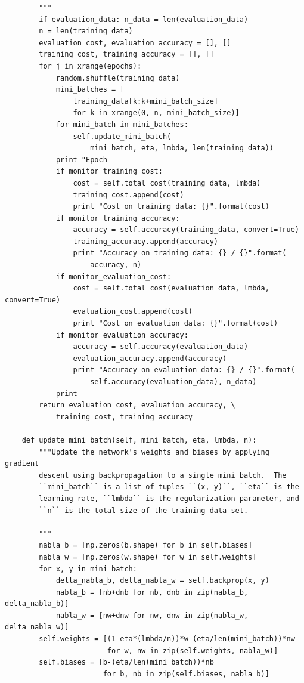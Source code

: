 \begin{lstlisting}
        """
        if evaluation_data: n_data = len(evaluation_data)
        n = len(training_data)
        evaluation_cost, evaluation_accuracy = [], []
        training_cost, training_accuracy = [], []
        for j in xrange(epochs):
            random.shuffle(training_data)
            mini_batches = [
                training_data[k:k+mini_batch_size]
                for k in xrange(0, n, mini_batch_size)]
            for mini_batch in mini_batches:
                self.update_mini_batch(
                    mini_batch, eta, lmbda, len(training_data))
            print "Epoch
            if monitor_training_cost:
                cost = self.total_cost(training_data, lmbda)
                training_cost.append(cost)
                print "Cost on training data: {}".format(cost)
            if monitor_training_accuracy:
                accuracy = self.accuracy(training_data, convert=True)
                training_accuracy.append(accuracy)
                print "Accuracy on training data: {} / {}".format(
                    accuracy, n)
            if monitor_evaluation_cost:
                cost = self.total_cost(evaluation_data, lmbda, convert=True)
                evaluation_cost.append(cost)
                print "Cost on evaluation data: {}".format(cost)
            if monitor_evaluation_accuracy:
                accuracy = self.accuracy(evaluation_data)
                evaluation_accuracy.append(accuracy)
                print "Accuracy on evaluation data: {} / {}".format(
                    self.accuracy(evaluation_data), n_data)
            print
        return evaluation_cost, evaluation_accuracy, \
            training_cost, training_accuracy

    def update_mini_batch(self, mini_batch, eta, lmbda, n):
        """Update the network's weights and biases by applying gradient
        descent using backpropagation to a single mini batch.  The
        ``mini_batch`` is a list of tuples ``(x, y)``, ``eta`` is the
        learning rate, ``lmbda`` is the regularization parameter, and
        ``n`` is the total size of the training data set.

        """
        nabla_b = [np.zeros(b.shape) for b in self.biases]
        nabla_w = [np.zeros(w.shape) for w in self.weights]
        for x, y in mini_batch:
            delta_nabla_b, delta_nabla_w = self.backprop(x, y)
            nabla_b = [nb+dnb for nb, dnb in zip(nabla_b, delta_nabla_b)]
            nabla_w = [nw+dnw for nw, dnw in zip(nabla_w, delta_nabla_w)]
        self.weights = [(1-eta*(lmbda/n))*w-(eta/len(mini_batch))*nw
                        for w, nw in zip(self.weights, nabla_w)]
        self.biases = [b-(eta/len(mini_batch))*nb
                       for b, nb in zip(self.biases, nabla_b)]


\end{lstlisting}
